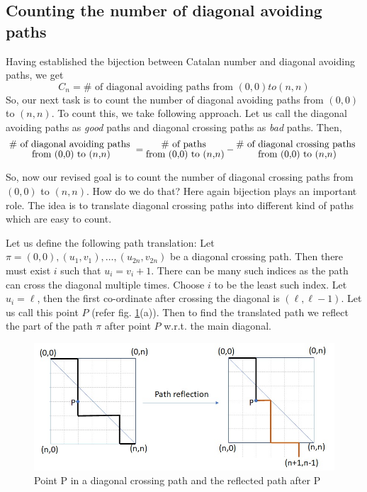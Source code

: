 
\subsection{Counting the number of diagonal avoiding paths} 
Having established the bijection between Catalan number and diagonal avoiding paths, we get  
\begin{equation}
\label{eq:catalan-expr-1}
    C_n = \# \text{ of diagonal avoiding paths from } (0,0) to (n,n) 
\end{equation}
So, our next task is to count the number of diagonal avoiding paths from $(0,0)$ to $(n,n)$. 
To count this, we take following approach. Let us call the diagonal avoiding paths as \textit{good} paths and diagonal crossing paths as \textit{bad} paths. Then,
\begin{equation}
\label{eq:no-of-good-paths}
\Large
    \substack{\text{\# of diagonal avoiding paths }\\ \text{from } (0,0) \text{ to } (n,n)}  = \substack{\text{\# of paths }\\ \text{from } (0,0) \text{ to } (n,n)} - \substack{\text{\# of diagonal crossing paths }\\ \text{from } (0,0) \text{ to } (n,n)}
\end{equation}  

So, now our revised goal is to count the number of diagonal crossing paths from $(0,0)$ to $(n,n)$. How do we do that? Here again bijection plays an important role. The idea is to translate diagonal crossing paths into  different kind of paths which are easy to count. 

Let us define the following path translation:  Let $\pi=(0,0), (u_1,v_1), \ldots, (u_{2n}, v_{2n})$ be  a diagonal crossing path. Then there must exist $i$ such that $u_i = v_i+1$. There can be many such indices as the path can cross the diagonal multiple times. Choose $i$ to be the least such index. Let $u_i = \ell$, then the first co-ordinate after crossing the diagonal is $(\ell, \ell-1)$. Let us call this point $P$ (refer fig. \ref{fig:reflecting-path}(a)). Then to find the translated path we reflect the part of the path $\pi$ after point $P$ w.r.t. the main diagonal. 

\begin{figure}[h!]
    \centering
    \includegraphics[width=0.7\linewidth]{images/reflecting-path.jpeg}
    \caption{Point P in a diagonal crossing path and the reflected path after P}
    \label{fig:reflecting-path}
\end{figure}

